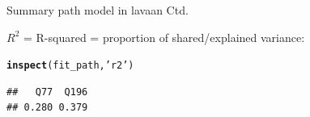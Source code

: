\documentclass[10pt]{beamer}\usepackage[]{graphicx}\usepackage[]{xcolor}
\makeatletter
\newcommand{\hlstr}[1]{\textcolor[rgb]{0.192,0.494,0.8}{#1}}%
\newcommand{\hlstd}[1]{\textcolor[rgb]{0.345,0.345,0.345}{#1}}%
\newcommand{\hlkwd}[1]{\textcolor[rgb]{0.737,0.353,0.396}{\textbf{#1}}}%
\newenvironment{kframe}{%
 \def\at@end@of@kframe{}%
 \ifinner\ifhmode%
  \def\at@end@of@kframe{\end{minipage}}%
  \begin{minipage}{\columnwidth}%
 \fi\fi%
 \def\FrameCommand##1{\hskip\@totalleftmargin \hskip-\fboxsep
 \colorbox{shadecolor}{##1}\hskip-\fboxsep
     \hskip-\linewidth \hskip-\@totalleftmargin \hskip\columnwidth}%
 \MakeFramed {\advance\hsize-\width
   \@totalleftmargin\z@ \linewidth\hsize
   \@setminipage}}%
 {\par\unskip\endMakeFramed%
 \at@end@of@kframe}
\newenvironment{knitrout}{}{} %
\makeatother
\begin{document}
\begin{frame}[fragile]{Summary path model in lavaan Ctd.}

$R^2$ = R-squared = proportion of shared/explained variance:
\begin{knitrout}
\color{fgcolor}\begin{kframe}
\begin{alltt}
\hlkwd{inspect}\hlstd{(fit_path,} \hlstr{'r2'}\hlstd{)}
\end{alltt}
\begin{verbatim}
##   Q77  Q196 
## 0.280 0.379
\end{verbatim}
\end{kframe}
\end{knitrout}

%

\end{frame}
%
%
%
%
%
%
%
%
%
%
%
%
\end{document}
